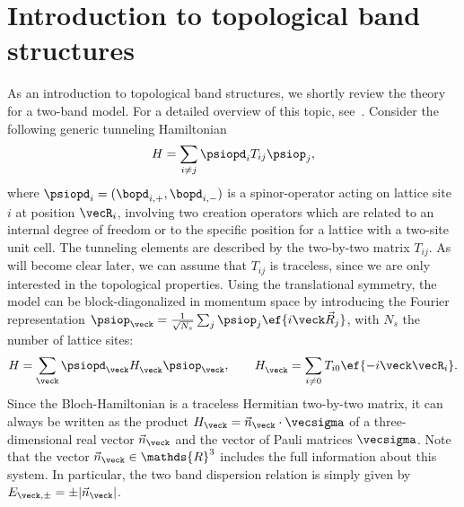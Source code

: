 \section{Introduction to topological band structures}

As an introduction to topological band structures, we shortly review the theory for a two-band model.
For a detailed overview of this topic, see~.
Consider the following generic tunneling Hamiltonian
\begin{align}
    H = \sum_{i\ne j} \psiopd_i T_{ij} \psiop_j,
\end{align}
where $\psiopd_i = (\bopd_{i,+}, \bopd_{i,-})$ is a spinor-operator acting on lattice site $i$ at position $\vecR_i$, involving two creation operators which are related to an internal degree of freedom or to the specific position for a lattice with a two-site unit cell.
The tunneling elements are described by the two-by-two matrix $T_{ij}$.
As will become clear later, we can assume that $T_{ij}$ is traceless, since we are only interested in the topological properties.
Using the translational symmetry, the model can be block-diagonalized in momentum space by introducing the Fourier representation $\psiop_{\veck}=\frac{1}{\sqrt{N_s}}\sum_{j} \psiop_{j}\ef{i\veck\vec{R}_j}$, with $N_s$ the number of lattice sites:
\begin{align}
    H=\sum_\veck \psiopd_{\veck} H^{\vphantom\dag}_\veck \psiop_{\veck}, \qquad
    H^{\vphantom\dag}_\veck = \sum_{i\ne 0} T_{i0} \ef{-i\veck \vecR_i}.
\end{align}
Since the Bloch-Hamiltonian is a traceless Hermitian two-by-two matrix, it can always be written as the product $H_\veck = \vec{n}_\veck \cdot \vecsigma$ of a three-dimensional real vector $\vec{n}_{\veck}$ and the vector of Pauli matrices $\vecsigma$.
Note that the vector $\vec{n}_\veck \in \mathds{R}^3$ includes the full information about this system.
In particular, the two band dispersion relation is simply given by $E_{\veck,\pm} = \pm |\vec{n}_\veck|$.


